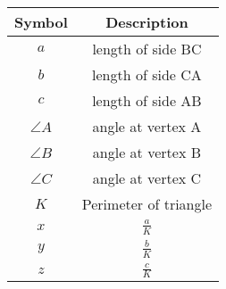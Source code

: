 \begin{tabular}[12pt]{ |c|c|}
    \hline
    \textbf{Symbol} & \textbf{Description} \\
    \hline
    \textbf{$a$} & length of side BC\\
    \hline
    \textbf{$b$} & length of side CA\\
    \hline
    \textbf{$c$} & length of side AB\\
    \hline
    $\angle A$ & angle at vertex A\\
    \hline
    $\angle B$ & angle at vertex B\\
    \hline
    $\angle C$ & angle at vertex C\\
    \hline
    \textbf{$K$} & Perimeter of triangle\\
    \hline
    \textbf{$x$} & $\frac{a}{K}$\\
    \hline
    \textbf{$y$} & $\frac{b}{K}$\\
    \hline
    \textbf{$z$} & $\frac{c}{K}$\\
    \hline
    \end{tabular}
